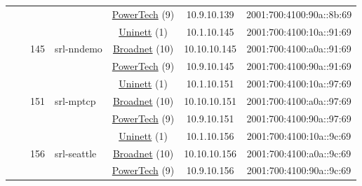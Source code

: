 \begin{small}
\begin{center}
\begin{longtable}{|c|c|c|c|c|c|c|c|}
  &  &  &  & \multicolumn{2}{|c|}{\tiny{\href{http://www.powertech.no}{PowerTech} (9)}} & \tiny{10.9.10.139} & \tiny{2001:700:4100:90a::8b:69} \\* \cline{3-3}\cline{4-4}\cline{5-5}\cline{6-6}\cline{7-7}\cline{8-8}
  &  & \multirow{3}{*}{\tiny{145}} & \multicolumn{1}{|l|}{\multirow{3}{*}{\tiny{srl-nndemo}}} & \multicolumn{2}{|c|}{\tiny{\href{https://www.uninett.no}{Uninett} (1)}} & \tiny{10.1.10.145} & \tiny{2001:700:4100:10a::91:69} \\* \cline{5-5}\cline{6-6}\cline{7-7}\cline{8-8}
  &  &  &  & \multicolumn{2}{|c|}{\tiny{\href{https://www.broadnet.no}{Broadnet} (10)}} & \tiny{10.10.10.145} & \tiny{2001:700:4100:a0a::91:69} \\* \cline{5-5}\cline{6-6}\cline{7-7}\cline{8-8}
  &  &  &  & \multicolumn{2}{|c|}{\tiny{\href{http://www.powertech.no}{PowerTech} (9)}} & \tiny{10.9.10.145} & \tiny{2001:700:4100:90a::91:69} \\* \cline{3-3}\cline{4-4}\cline{5-5}\cline{6-6}\cline{7-7}\cline{8-8}
  &  & \multirow{3}{*}{\tiny{151}} & \multicolumn{1}{|l|}{\multirow{3}{*}{\tiny{srl-mptcp}}} & \multicolumn{2}{|c|}{\tiny{\href{https://www.uninett.no}{Uninett} (1)}} & \tiny{10.1.10.151} & \tiny{2001:700:4100:10a::97:69} \\* \cline{5-5}\cline{6-6}\cline{7-7}\cline{8-8}
  &  &  &  & \multicolumn{2}{|c|}{\tiny{\href{https://www.broadnet.no}{Broadnet} (10)}} & \tiny{10.10.10.151} & \tiny{2001:700:4100:a0a::97:69} \\* \cline{5-5}\cline{6-6}\cline{7-7}\cline{8-8}
  &  &  &  & \multicolumn{2}{|c|}{\tiny{\href{http://www.powertech.no}{PowerTech} (9)}} & \tiny{10.9.10.151} & \tiny{2001:700:4100:90a::97:69} \\* \cline{3-3}\cline{4-4}\cline{5-5}\cline{6-6}\cline{7-7}\cline{8-8}
  &  & \multirow{3}{*}{\tiny{156}} & \multicolumn{1}{|l|}{\multirow{3}{*}{\tiny{srl-seattle}}} & \multicolumn{2}{|c|}{\tiny{\href{https://www.uninett.no}{Uninett} (1)}} & \tiny{10.1.10.156} & \tiny{2001:700:4100:10a::9c:69} \\* \cline{5-5}\cline{6-6}\cline{7-7}\cline{8-8}
  &  &  &  & \multicolumn{2}{|c|}{\tiny{\href{https://www.broadnet.no}{Broadnet} (10)}} & \tiny{10.10.10.156} & \tiny{2001:700:4100:a0a::9c:69} \\* \cline{5-5}\cline{6-6}\cline{7-7}\cline{8-8}
  &  &  &  & \multicolumn{2}{|c|}{\tiny{\href{http://www.powertech.no}{PowerTech} (9)}} & \tiny{10.9.10.156} & \tiny{2001:700:4100:90a::9c:69} \\* \cline{3-3}\cline{4-4}\cline{5-5}\cline{6-6}\cline{7-7}\cline{8-8}

\end{longtable}
\end{center}
\end{small}
